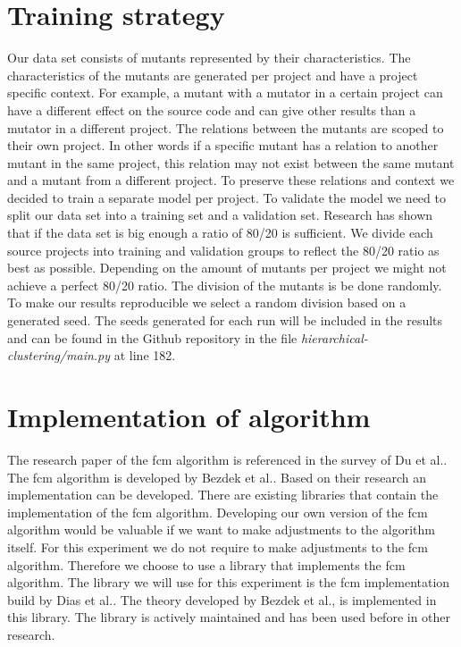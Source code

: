 \documentclass[../../main]{subfiles}
\begin{document}
\section{Training strategy}
\label{ch:training_strategy}
Our data set consists of mutants represented by their characteristics. 
The characteristics of the mutants are generated per project and have a project specific context.
For example, a mutant with a mutator in a certain project can have a different effect on the source code and can give other results than a mutator in a different project.
The relations between the mutants are scoped to their own project. 
In other words if a specific mutant has a relation to another mutant in the same project, this relation may not exist between the same mutant and a mutant from a different project.
To preserve these relations and context we decided to train a separate model per project.
\newline
To validate the model we need to split our data set into a training set and a validation set.
Research has shown that if the data set is big enough a ratio of 80/20 is sufficient\cite{Guyon1997ARatio}.
We divide each source projects into training and validation groups to reflect the 80/20 ratio as best as possible.
Depending on the amount of mutants per project we might not achieve a perfect 80/20 ratio.
The division of the mutants is be done randomly. 
To make our results reproducible we select a random division based on a generated seed.
The seeds generated for each run will be included in the results and can be found in the Github repository in the file \textit{hierarchical-clustering/main.py} at line 182\cite{rbasarat-repo}.

\section{Implementation of algorithm}
\label{ch:fcm_implementation}
The research paper of the \acrshort{fcm} algorithm is referenced in the survey of Du et al.\cite{Du2010Clustering:Approach}.
The \acrshort{fcm} algorithm is developed by Bezdek et al.\cite{Bezdek1984FCM:Algorithm}.
Based on their research an implementation can be developed.
There are existing libraries that contain the implementation of the \acrshort{fcm} algorithm.
Developing our own version of the \acrshort{fcm} algorithm would be valuable if we want to make adjustments to the algorithm itself.
For this experiment we do not require to make adjustments to the \acrshort{fcm} algorithm.
Therefore we choose to use a library that implements the \acrshort{fcm} algorithm.
The library we will use for this experiment is the \acrlong{fcm} implementation build by Dias et al.\cite{dias2019fuzzy}.
The theory developed by Bezdek et al., is implemented in this library.
The library is actively maintained and has been used before in other research\cite{DeAlmeidaNeto2020, Kopf2019, Nwadiugwu2020}.
\end{document}
